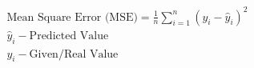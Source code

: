 \documentclass[12pt]{standalone}
\begin{document}
   \begin{varwidth}{50in}
        \begin{equation*}
        	        \begin{aligned}        	      
        	        \textrm{Mean Square Error (MSE)} = \frac{1}{n} \sum_{i=1}^{n} (y_i - \hat{y}_i)^2 \\
        	        \hat{y}_i - \textrm{Predicted Value } \\
        	        {y}_i - \textrm{Given/Real Value }
        	        \end{aligned}
        \end{equation*}
    \end{varwidth}
\end{document}
